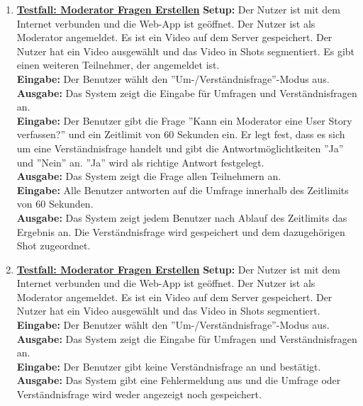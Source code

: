 \begin{enumerate}
	
	\item \underline{\textbf{Testfall: Moderator Fragen Erstellen}} \linebreak
	\textbf{Setup:} Der Nutzer ist mit dem Internet verbunden und die Web-App ist geöffnet. Der Nutzer ist als Moderator angemeldet. Es ist ein Video auf dem Server gespeichert. Der Nutzer hat ein Video ausgewählt und das Video in Shots segmentiert. Es gibt einen weiteren Teilnehmer, der angemeldet ist.  \\
	\textbf{Eingabe:} Der Benutzer wählt den ''Um-/Verständnisfrage''-Modus aus. \\
	\textbf{Ausgabe:} Das System zeigt die Eingabe für Umfragen und Verständnisfragen an.\\ 
	\textbf{Eingabe:} Der Benutzer gibt die Frage ''Kann ein Moderator eine User Story verfassen?'' und ein Zeitlimit von 60 Sekunden ein. Er legt fest, dass es sich um eine Verständnisfrage handelt und gibt die Antwortmöglichtkeiten ''Ja'' und ''Nein'' an. ''Ja'' wird als richtige Antwort festgelegt.\\
	\textbf{Ausgabe:} Das System zeigt die Frage allen Teilnehmern an.\\ 
	\textbf{Eingabe:} Alle Benutzer antworten auf die Umfrage innerhalb des Zeitlimits von 60 Sekunden.\\
	\textbf{Ausgabe:} Das System zeigt jedem Benutzer nach Ablauf des Zeitlimits das Ergebnis an. Die Verständnisfrage wird gespeichert und dem dazugehörigen Shot zugeordnet.\\
	
	\item \underline{\textbf{Testfall: Moderator Fragen Erstellen}} \linebreak
	\textbf{Setup:} Der Nutzer ist mit dem Internet verbunden und die Web-App ist geöffnet. Der Nutzer ist als Moderator angemeldet. Es ist ein Video auf dem Server gespeichert. Der Nutzer hat ein Video ausgewählt und das Video in Shots segmentiert. \\
	\textbf{Eingabe:} Der Benutzer wählt den ''Um-/Verständnisfrage''-Modus aus. \\
	\textbf{Ausgabe:} Das System zeigt die Eingabe für Umfragen und Verständnisfragen an.\\ 
	\textbf{Eingabe:} Der Benutzer gibt keine Verständnisfrage an und bestätigt.\\
	\textbf{Ausgabe:} Das System gibt eine Fehlermeldung aus und die Umfrage oder Verständnisfrage wird weder angezeigt noch gespeichert.
	

\end{enumerate}
